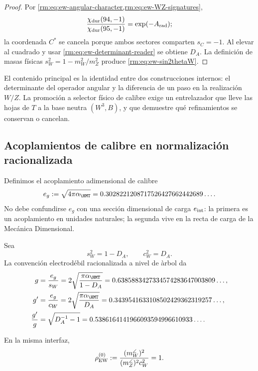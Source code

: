 \begin{proof}
Por \cref{rm:eq:ew-angular-character,rm:eq:ew-WZ-signatures},
\[
\frac{\chi_{\rm dur}(94,-1)}{\chi_{\rm dur}(95,-1)}
=\exp(-A_{\rm rad});
\]
la coordenada \(C^*\) se cancela porque ambos sectores comparten
\(s_C=-1\). Al elevar al cuadrado y usar
\cref{rm:eq:ew-determinant-reader} se obtiene \(D_A\). La definici\'on
de masas f\'isicas \(s_W^2=1-m_W^2/m_Z^2\) produce
\cref{rm:eq:ew-sin2thetaW}.
\end{proof}

El contenido principal es la identidad entre dos construcciones
internos: el determinante del operador angular y la diferencia de un paso
en la realizaci\'on \(W/Z\). La promoci\'on a selector f\'isico de calibre exige
un entrelazador que lleve las hojas de \(T\) a la base neutra
\((W^3,B)\), y que demuestre qu\'e refinamientos se conservan o cancelan.

\subsection{Acoplamientos de calibre en normalizaci\'on racionalizada}

Definimos el acoplamiento adimensional de calibre
\begin{equation}
\label{rm:eq:ew-egauge}
e_g:=\sqrt{4\pi\alpha_{\HMT}}
=0.3028221208717526427662442689\ldots .
\end{equation}
No debe confundirse \(e_g\) con una secci\'on dimensional de carga
\(e_{\rm int}\): la primera es un acoplamiento en unidades naturales; la
segunda vive en la recta de carga de la Mec\'anica Dimensional.

Sea
\begin{equation}
\label{rm:eq:ew-sw-cw}
s_W^2=1-D_A,
\qquad
c_W^2=D_A.
\end{equation}
La convenci\'on electrod\'ebil racionalizada a nivel de \`arbol da
\begin{align}
g&=\frac{e_g}{s_W}
=2\sqrt{\frac{\pi\alpha_{\HMT}}{1-D_A}}
=0.6385883427334574283647003809\ldots,
\label{rm:eq:ew-g}\\
g'&=\frac{e_g}{c_W}
=2\sqrt{\frac{\pi\alpha_{\HMT}}{D_A}}
=0.3439541633108502429362319257\ldots,
\label{rm:eq:ew-gprime}\\
\frac{g'}{g}
&=\sqrt{D_A^{-1}-1}
=0.5386164141966093594996610933\ldots .
\label{rm:eq:ew-gprime-over-g}
\end{align}

\begin{proposition}
\label{rm:prop:ew-rho}
En la misma interfaz,
\begin{equation}
\label{rm:eq:ew-rho}
\rho_{\rm EW}^{(0)}
:=\frac{(m_W^{\angle})^2}
{(m_Z^{\angle})^2c_W^2}=1.
\end{equation}
\end{proposition}

